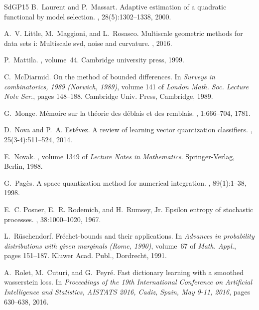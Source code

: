 \documentclass[sts]{imsart}
\begin{document}
\begin{thebibliography}{SdGP{\etalchar{+}}15}
B.~Laurent and P.~Massart.
\newblock Adaptive estimation of a quadratic functional by model selection.
, 28(5):1302--1338, 2000.

A.~V. Little, M.~Maggioni, and L.~Rosasco.
\newblock Multiscale geometric methods for data sets i: Multiscale svd, noise
  and curvature.
, 2016.

P.~Mattila.
, volume~44.
\newblock Cambridge university press, 1999.

C.~McDiarmid.
\newblock On the method of bounded differences.
\newblock In {\em Surveys in combinatorics, 1989 ({N}orwich, 1989)}, volume 141
  of {\em London Math. Soc. Lecture Note Ser.}, pages 148--188. Cambridge Univ.
  Press, Cambridge, 1989.

G.~Monge.
\newblock M{\'e}moire sur la th{\'e}orie des d{\'e}blais et des remblais.
, 1:666--704,
  1781.

D.~Nova and P.~A. Est{\'e}vez.
\newblock A review of learning vector quantization classifiers.
, 25(3-4):511--524, 2014.

E.~Novak.
, volume 1349 of {\em Lecture Notes in Mathematics}.
\newblock Springer-Verlag, Berlin, 1988.

G.~Pag\`es.
\newblock A space quantization method for numerical integration.
, 89(1):1--38, 1998.

E.~C. Posner, E.~R. Rodemich, and H.~Rumsey, Jr.
\newblock Epsilon entropy of stochastic processes.
, 38:1000--1020, 1967.

L.~R\"uschendorf.
\newblock Fr\'echet-bounds and their applications.
\newblock In {\em Advances in probability distributions with given marginals
  ({R}ome, 1990)}, volume~67 of {\em Math. Appl.}, pages 151--187. Kluwer Acad.
  Publ., Dordrecht, 1991.

A.~Rolet, M.~Cuturi, and G.~Peyr{\'{e}}.
\newblock Fast dictionary learning with a smoothed wasserstein loss.
\newblock In {\em Proceedings of the 19th International Conference on
  Artificial Intelligence and Statistics, {AISTATS} 2016, Cadiz, Spain, May
  9-11, 2016}, pages 630--638, 2016.


\end{thebibliography}
\end{document}
